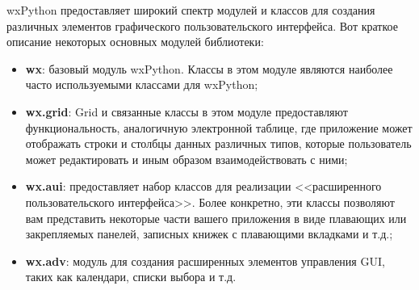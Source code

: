 wxPython предоставляет широкий спектр модулей и классов для создания различных элементов графического пользовательского интерфейса. Вот краткое описание некоторых основных модулей библиотеки:
\begin{itemize}
\item \textbf{wx}: базовый модуль wxPython. Классы в этом модуле являются наиболее часто используемыми классами для wxPython;
\item \textbf{wx.grid}: Grid и связанные классы в этом модуле предоставляют функциональность, аналогичную электронной таблице, где приложение может отображать строки и столбцы данных различных типов, которые пользователь может редактировать и иным образом взаимодействовать с ними;
\item \textbf{wx.aui}: предоставляет набор классов для реализации <<расширенного пользовательского интерфейса>>. Более конкретно, эти классы позволяют вам представить некоторые части вашего приложения в виде плавающих или закрепляемых панелей, записных книжек с плавающими вкладками и т.д.;
\item \textbf{wx.adv}: модуль для создания расширенных элементов управления GUI, таких как календари, списки выбора и т.д.
\end{itemize}
